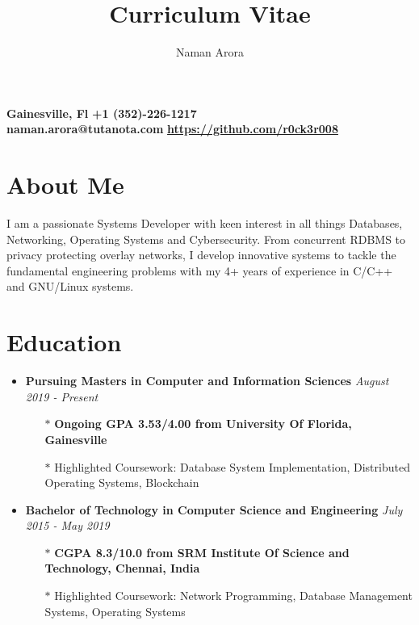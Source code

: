 \documentclass[10pt,a4paper]{article}
\makeatletter
\renewcommand{\maketitle}
{
	\begin{flushleft}
		\textbf{\Huge\theauthor}
	\end{flushleft}
	\begin{flushleft}
		\small{\textbf{{\faMapMarker} \hspace{0.2cm} Gainesville, Fl} \hspace{2.5cm} \textbf{{\faMobile} \hspace{0.2cm} +1 (352)-226-1217} \\
				\textbf{{\faEnvelope} \hspace{0.1cm} naman.arora@tutanota.com} \hspace{0.5cm}
				\textbf{{\faGithub} \hspace{0.1cm} \href{https://github.com/r0ck3r008}{https://github.com/r0ck3r008}}}
	\end{flushleft}
}
\makeatother
\begin{document}
\title{Curriculum Vitae}
\author{Naman Arora}
\maketitle


\section{{\faUser} About Me}
\begin{flushleft}
	I am a passionate Systems Developer with keen interest in all things Databases, Networking, Operating Systems and Cybersecurity. From concurrent RDBMS to privacy protecting overlay networks, I develop innovative systems to tackle the fundamental engineering problems with my 4+ years of experience in C/C++ and GNU/Linux systems.
\end{flushleft}

\section{{\faUniversity} Education}

\begin{itemize}[noitemsep,nolistsep]
	\item{\textbf{Pursuing Masters in Computer and Information Sciences} \hfill \textit{August 2019 - Present}}
		\begin{itemize}[leftmargin=*]
			\setlength\itemsep{-0.25em}
			\item[$\ast$]{\textbf{Ongoing GPA 3.53/4.00 from University Of Florida, Gainesville}}
			\item[$\ast$]{Highlighted Coursework: Database System Implementation, Distributed Operating Systems, Blockchain}
		\end{itemize}
	\item{\textbf{Bachelor of Technology in Computer Science and Engineering} \hfill \textit{July 2015 - May 2019}}
		\begin{itemize}[leftmargin=*]
			\setlength\itemsep{-0.25em}
			\item[$\ast$]{\textbf{CGPA 8.3/10.0 from SRM Institute Of Science and Technology, Chennai, India}}
			\item[$\ast$]{Highlighted Coursework: Network Programming, Database Management Systems, Operating Systems}
		\end{itemize}
\end{itemize}
\end{document}
